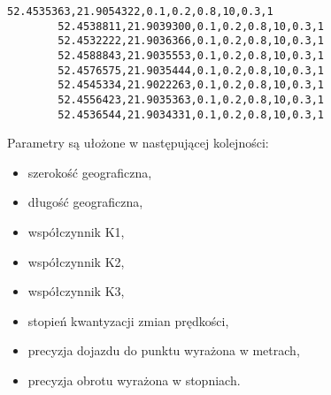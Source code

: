 {{    \vspace{2mm}
    
    \begin{lstlisting}[caption=Przykładowy plik misji]
        52.4535363,21.9054322,0.1,0.2,0.8,10,0.3,1
        52.4538811,21.9039300,0.1,0.2,0.8,10,0.3,1
        52.4532222,21.9036366,0.1,0.2,0.8,10,0.3,1
        52.4588843,21.9035553,0.1,0.2,0.8,10,0.3,1
        52.4576575,21.9035444,0.1,0.2,0.8,10,0.3,1
        52.4545334,21.9022263,0.1,0.2,0.8,10,0.3,1
        52.4556423,21.9035363,0.1,0.2,0.8,10,0.3,1
        52.4536544,21.9034331,0.1,0.2,0.8,10,0.3,1
    \end{lstlisting}

    \vspace{2mm}
    
    Parametry są ułożone w następującej kolejności:
    \begin{itemize}
            \item szerokość geograficzna,
            \item długość geograficzna,
            \item współczynnik K1,
            \item współczynnik K2,
            \item współczynnik K3,
            \item stopień kwantyzacji zmian prędkości,
            \item precyzja dojazdu do punktu wyrażona w metrach,
            \item precyzja obrotu wyrażona w stopniach.
    \end{itemize}
    }
}